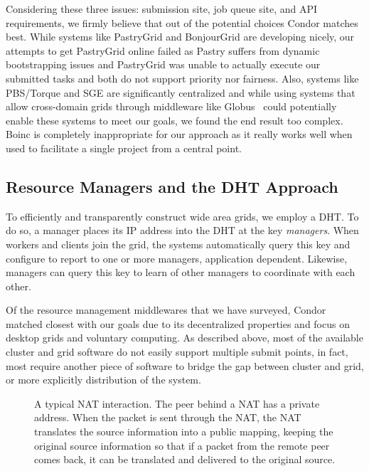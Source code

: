\documentclass[conference]{IEEEtran}
\begin{document}
\addtocounter{footnote}{1}
\addtocounter{footnote}{1}
\addtocounter{footnote}{1}

Considering these three issues:  submission site, job queue site, and API
requirements, we firmly believe that out of the potential choices Condor
matches best.  While systems like PastryGrid and BonjourGrid are developing
nicely, our attempts to get PastryGrid online failed as Pastry suffers from
dynamic bootstrapping issues and PastryGrid was unable to actually execute our
submitted tasks and both do not support priority nor fairness.  Also, systems
like PBS/Torque and SGE are significantly centralized and while using systems
that allow cross-domain grids through middleware like Globus~\cite{globus}
could potentially enable these systems to meet our goals, we found the end
result too complex.  Boinc is completely inappropriate for our approach as it
really works well when used to facilitate a single project from a central
point.

\subsection{Resource Managers and the DHT Approach}
\label{condor}

To efficiently and transparently construct wide area grids, we employ a DHT.
To do so, a manager places its IP address into the DHT at the key
\emph{managers}.  When workers and clients join the grid, the systems
automatically query this key and configure to report to one or more managers,
application dependent.  Likewise, managers can query this key to learn of other
managers to coordinate with each other.

Of the resource management middlewares that we have surveyed, Condor matched
closest with our goals due to its decentralized properties and focus on desktop
grids and voluntary computing.  As described above, most of the available
cluster and grid software do not easily support multiple submit points, in
fact, most require another piece of software to bridge the gap between cluster
and grid, or more explicitly distribution of the system.

\begin{figure}[h!t!]
\centering
{}
\caption{A typical NAT interaction. The peer behind a NAT has a private address.
When the packet is sent through the NAT, the NAT translates the source information
into a public mapping, keeping the original source information so that if a
packet from the remote peer comes back, it can be translated and delivered to
the original source.}
\label{fig:nat}
\end{figure}
\end{document}
